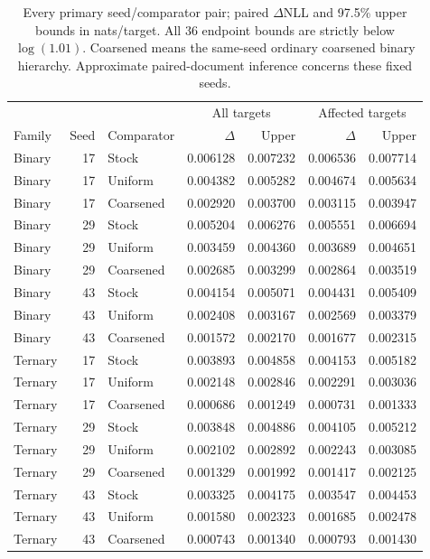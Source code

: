 \documentclass[11pt]{article}
\begin{document}
\begin{table}[ht]
\centering\small
\caption{Every primary seed/comparator pair; paired \(\Delta\)NLL and 97.5\%
upper bounds in nats/target. All 36 endpoint bounds are strictly below
\(\log(1.01)\). Coarsened means the same-seed ordinary coarsened binary
hierarchy. Approximate paired-document inference concerns these fixed seeds.}
\label{tab:heldout-primary}
\begin{tabular}{lrlrrrr}
\toprule
& & & \multicolumn{2}{c}{All targets} & \multicolumn{2}{c}{Affected targets} \\
Family & Seed & Comparator & $\Delta$ & Upper & $\Delta$ & Upper \\
\midrule
Binary & 17 & Stock & 0.006128 & 0.007232 & 0.006536 & 0.007714 \\
Binary & 17 & Uniform & 0.004382 & 0.005282 & 0.004674 & 0.005634 \\
Binary & 17 & Coarsened & 0.002920 & 0.003700 & 0.003115 & 0.003947 \\
Binary & 29 & Stock & 0.005204 & 0.006276 & 0.005551 & 0.006694 \\
Binary & 29 & Uniform & 0.003459 & 0.004360 & 0.003689 & 0.004651 \\
Binary & 29 & Coarsened & 0.002685 & 0.003299 & 0.002864 & 0.003519 \\
Binary & 43 & Stock & 0.004154 & 0.005071 & 0.004431 & 0.005409 \\
Binary & 43 & Uniform & 0.002408 & 0.003167 & 0.002569 & 0.003379 \\
Binary & 43 & Coarsened & 0.001572 & 0.002170 & 0.001677 & 0.002315 \\
\midrule
Ternary & 17 & Stock & 0.003893 & 0.004858 & 0.004153 & 0.005182 \\
Ternary & 17 & Uniform & 0.002148 & 0.002846 & 0.002291 & 0.003036 \\
Ternary & 17 & Coarsened & 0.000686 & 0.001249 & 0.000731 & 0.001333 \\
Ternary & 29 & Stock & 0.003848 & 0.004886 & 0.004105 & 0.005212 \\
Ternary & 29 & Uniform & 0.002102 & 0.002892 & 0.002243 & 0.003085 \\
Ternary & 29 & Coarsened & 0.001329 & 0.001992 & 0.001417 & 0.002125 \\
Ternary & 43 & Stock & 0.003325 & 0.004175 & 0.003547 & 0.004453 \\
Ternary & 43 & Uniform & 0.001580 & 0.002323 & 0.001685 & 0.002478 \\
Ternary & 43 & Coarsened & 0.000743 & 0.001340 & 0.000793 & 0.001430 \\
\bottomrule
\end{tabular}
\end{table}
\end{document}
